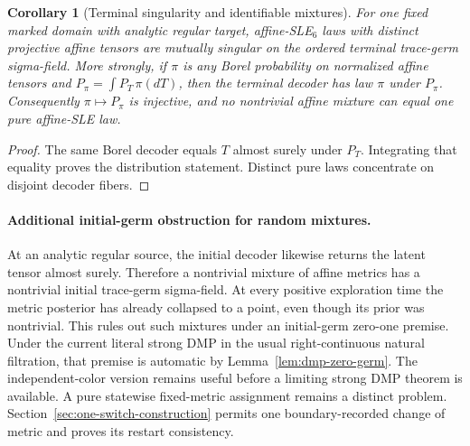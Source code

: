 \documentclass[11pt]{article}
\newtheorem{corollary}[theorem]{Corollary}
\theoremstyle{definition}\newtheorem{definition}[theorem]{Definition}
\theoremstyle{remark}\newtheorem{remark}[theorem]{Remark}
\begin{document}
\begin{corollary}[Terminal singularity and identifiable mixtures]
\label{cor:ed-mixtures}
For one fixed marked domain with analytic regular target, affine-SLE$_6$
laws with distinct projective affine tensors are mutually singular on
the ordered terminal trace-germ sigma-field. More strongly, if
$\pi$ is any Borel probability on normalized affine tensors and
$P_\pi=\int P_T\,\pi(dT)$, then the terminal decoder has law $\pi$
under $P_\pi$. Consequently $\pi\mapsto P_\pi$ is injective, and no
nontrivial affine mixture can equal one pure affine-SLE law.
\end{corollary}
\begin{proof}
The same Borel decoder equals $T$ almost surely under $P_T$.
Integrating that equality proves the distribution statement. Distinct
pure laws concentrate on disjoint decoder fibers.
\end{proof}

\paragraph{Additional initial-germ obstruction for random mixtures.}
At an analytic regular source, the initial decoder likewise returns the
latent tensor almost surely. Therefore a nontrivial mixture of affine
metrics has a nontrivial initial trace-germ sigma-field. At every
positive exploration time the metric posterior has already collapsed to
a point, even though its prior was nontrivial. This rules out such mixtures under an initial-germ zero-one premise.
Under the current literal strong DMP in the usual right-continuous
natural filtration, that premise is automatic by
Lemma~\ref{lem:dmp-zero-germ}. The independent-color version remains
useful before a limiting strong DMP theorem is available. A pure statewise fixed-metric assignment remains a distinct problem.
Section~\ref{sec:one-switch-construction} permits one boundary-recorded
change of metric and proves its restart consistency.
\end{document}
